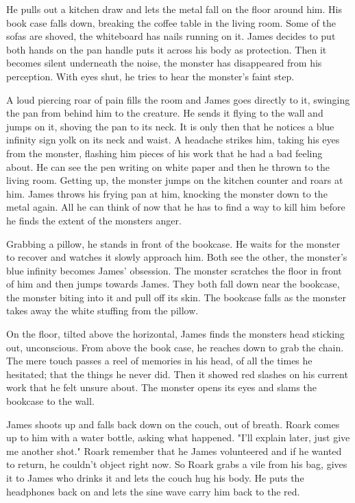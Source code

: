         He pulls out a kitchen draw and lets the metal fall on the floor around him. His book case falls down, breaking the coffee table in
    the living room. Some of the sofas are shoved, the whiteboard has nails running on it. James decides to put both hands on the pan handle
    puts it across his body as protection. Then it becomes silent underneath the noise, the monster has disappeared from his perception. With
    eyes shut, he tries to hear the monster's faint step.

        A loud piercing roar of pain fills the room and James goes directly to it, swinging the pan from behind him to the creature. He sends it
    flying to the wall and jumps on it, shoving the pan to its neck. It is only then that he notices a blue infinity sign yolk on its neck and 
    waist. A headache strikes him, taking his eyes from the monster, flashing him pieces of his work that he had a bad feeling about. He can
    see the pen writing on white paper and then he thrown to the living room. Getting up, the monster jumps on the kitchen counter and roars
    at him. James throws his frying pan at him, knocking the monster down to the metal again. All he can think of now that he has to find a way
    to kill him before he finds the extent of the monsters anger.

        Grabbing a pillow, he stands in front of the bookcase. He waits for the monster to recover and watches it slowly approach him. Both
    see the other, the monster's blue infinity becomes James' obsession. The monster scratches the floor in front of him and then jumps towards
    James. They both fall down near the bookcase, the monster biting into it and pull off its skin. The bookcase falls as the monster takes
    away the white stuffing from the pillow.

        On the floor, tilted above the horizontal, James finds the monsters head sticking out, unconscious. From above the book case, he reaches
    down to grab the chain. The mere touch passes a reel of memories in his head, of all the times he hesitated; that the things he never did.
    Then it showed red slashes on his current work that he felt unsure about. The monster opens its eyes and slams the bookcase to the wall.

        James shoots up and falls back down on the couch, out of breath. Roark comes up to him with a water bottle, asking what happened. "I'll
    explain later, just give me another shot." Roark remember that he James volunteered and if he wanted to return, he couldn't object right now.
    So Roark grabs a vile from his bag, gives it to James who drinks it and lets the couch hug his body. He puts the headphones back on and
    lets the sine wave carry him back to the red.

